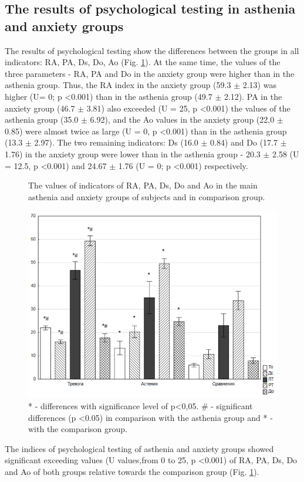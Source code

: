 \documentclass[twocolumn]{article}
\begin{document}
\subsection{The results of psychological testing in asthenia and anxiety groups}
\par The results of psychological testing show the differences between the groups in all indicators: RA, PA, Ds, Do, Ao (Fig. \ref{fig2}). At the same time, the values of the three parameters - RA, PA and Do in the anxiety group were higher than in the asthenia group. Thus, the RA index in the anxiety group (59.3 $\pm$ 2.13) was higher (U\cite{bib15}= 0; p \textless{}0.001) than in the asthenia group (49.7 $\pm$ 2.12). PA in the anxiety group (46.7 $\pm$ 3.81) also exceeded (U = 25, p \textless{}0.001) the values of the asthenia group (35.0 $\pm$ 6.92), and the Ao values in the anxiety group (22,0 $\pm$ 0.85) were almost twice as large (U = 0, p \textless{}0.001) than in the asthenia group (13.3 $\pm$ 2.97). The two remaining indicators: Ds (16.0 $\pm$ 0.84) and Do (17.7 $\pm$ 1.76) in the anxiety group were lower than in the asthenia group - 20.3 $\pm$ 2.58 (U = 12.5, p \textless{}0.001) and 24.67 $\pm$ 1.76 (U = 0; p \textless{}0.001) respectively.
\begin{figure}
\caption{The values of indicators of RA, PA, Ds, Do and Ao in the main asthenia and anxiety groups of subjects and in comparison group.}
\label{fig2}
\includegraphics[width=\linewidth ]{fig2.png}
\caption*{* - differences with significance level of p\textless{}0,05. \# - significant differences (p \textless{}0.05) in comparison with the asthenia group and * - with the comparison group.}
\end{figure}
\par The indices of psychological testing of asthenia and anxiety groups showed significant exceeding values (U values\cite{bib15},\cite{bib20}from 0 to 25, p \textless{}0.001) of RA, PA, Ds, Do and Ao of both groups relative towards the comparison group (Fig. \ref{fig2}).
\end{document}
